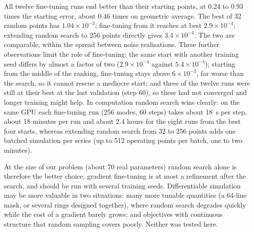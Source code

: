 All twelve fine-tuning runs end better than their starting points, at 0.24 to 0.93 times the starting error, about 0.46 times on
geometric average. The best of 32 random points has $1.04\times10^{-3}$; fine-tuning from it reaches at best $2.9\times10^{-4}$;
extending random search to 256 points directly gives $3.4\times10^{-4}$. The two are comparable, within the spread between noise
realisations. Three further observations limit the role of fine-tuning: the same start with another training seed differs by almost a
factor of two ($2.9\times10^{-4}$ against $5.4\times10^{-4}$); starting from the middle of the ranking, fine-tuning stays above
$6\times10^{-3}$, far worse than the search, so it cannot rescue a mediocre start; and three of the twelve runs were still at their
best at the last validation (step 60), so these had not converged and longer training might help.
In computation random search wins clearly: on the same GPU each fine-tuning run (256 modes, 60 steps) takes about 18~s per step,
about 18 minutes per run and about 2.4 hours for the eight runs from the best four starts, whereas extending random search from 32 to
256 points adds one batched simulation per series (up to 512 operating points per batch, one to two minutes).

At the size of our problem (about 70 real parameters) random search alone is therefore the better choice; gradient fine-tuning is at
most a refinement after the search, and should be run with several training seeds. Differentiable simulation may be more valuable in
two situations: many more tunable quantities (a 64-line mask, or several rings designed together), where random search degrades
quickly while the cost of a gradient barely grows; and objectives with continuous structure that random sampling covers poorly.
Neither was tested here.
